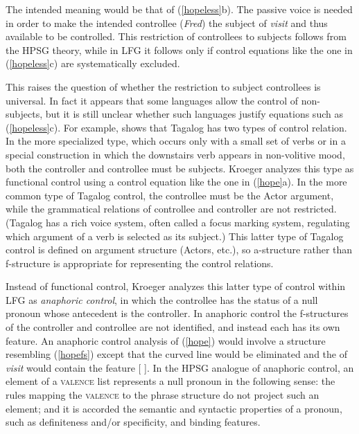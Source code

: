 \begin{exe} 
\ex 
\label{hopeless}
\begin{xlist}
\end{xlist}
\end{exe}
The intended meaning would be that of (\ref{hopeless}b).  The passive voice is needed in order to make the intended controllee (\textit{Fred})  the subject of \textit{visit} and thus available to be controlled.  This restriction of controllees to subjects follows from the HPSG theory, while in LFG it follows only if control equations  
 like the one in (\ref{hopeless}c) are systematically excluded.    

This raises the question of whether the restriction to subject controllees is universal.  In fact it appears that some languages allow the control of non-subjects, but it is still unclear whether such languages justify equations such as (\ref{hopeless}c).  For example,   \citet{kroeger:1993} shows that Tagalog has two types of control relation.  In the more specialized type, which occurs only with a small set of verbs or in a special construction in which the downstairs verb appears in non-volitive mood, both the controller and controllee must be subjects.  
Kroeger analyzes this type as functional control using a control equation like the one in (\ref{hope}a).  In the more common type of Tagalog control, the controllee must be the Actor argument, while the grammatical relations of controllee and controller are not restricted.  (Tagalog has a rich voice system, often called a focus marking system, regulating which argument of a verb is selected as its subject.)  
This latter type of Tagalog control is defined on argument structure (Actors, etc.), so a-structure rather than f-structure is appropriate for representing the control relations.    

Instead of functional control, Kroeger analyzes this latter type of control within LFG as \textit{anaphoric control}, in which the controllee has the status of a null pronoun whose antecedent is the controller.  In anaphoric control the f-structures of the controller and controllee are not identified, and instead each has its own  feature.  An anaphoric control analysis of (\ref{hope}) would involve a structure resembling (\ref{hopefs}) except that the curved line would be eliminated and the  of \textit{visit} would contain the feature [ ].  In the HPSG analogue of anaphoric control, an element of a \textsc{valence} list represents a null pronoun in the following sense:  the rules mapping the \textsc{valence} to the phrase structure do not project such an element; and it is accorded the semantic and syntactic properties of a pronoun, such as definiteness and/or specificity, and binding features.  


